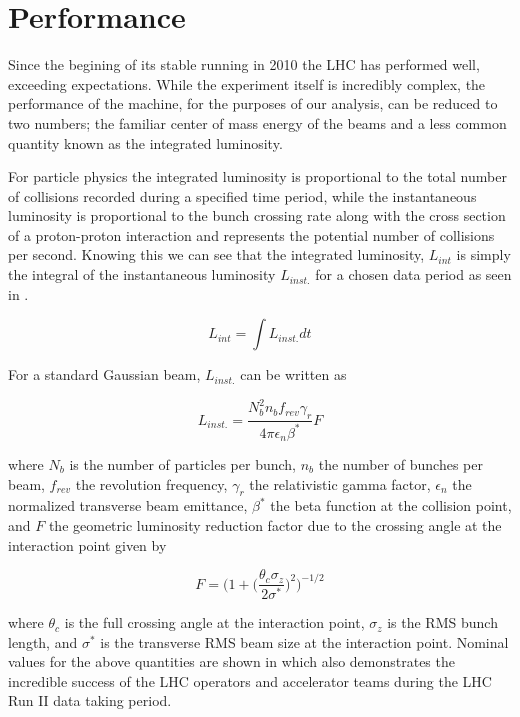 \section{Performance} \label{sec:lhc:performance}

Since the begining of its stable running in 2010 the LHC has performed well,
exceeding expectations.  While the experiment itself is incredibly complex, the
performance of the machine, for the purposes of our analysis, can be reduced to
two numbers; the familiar center of mass energy of the beams and a less common
quantity known as the integrated luminosity.  

For particle physics the integrated luminosity is proportional to the total
number of collisions recorded during a specified time period, while the
instantaneous luminosity is proportional to the bunch crossing rate along with
the cross section of a proton-proton interaction and represents the potential
number of collisions per second.  Knowing this we can see that the integrated
luminosity, $L_{int}$ is simply the integral of the instantaneous luminosity
$L_{inst.}$ for a chosen data period as seen in
.

\begin{equation} \label{eq:integrated_luminosity}
   L_{int} = \int L_{inst.}dt 
\end{equation}

For a standard Gaussian beam, $L_{inst.}$ can be written as

\begin{equation} \label{eq:inst_luminosity}
  L_{inst.} = \frac{N_{b}^{2}n_{b}f_{rev}\gamma_{r}}{4\pi\epsilon_{n}\beta^{*}}F
\end{equation}

where $N_{b}$ is the number of particles per bunch, $n_{b}$ the number of
bunches per beam, $f_{rev}$ the revolution frequency, $\gamma_{r}$ the
relativistic gamma factor, $\epsilon_{n}$ the normalized transverse beam
emittance, $\beta^{*}$ the beta function at the collision point, and $F$ the
geometric luminosity reduction factor due to the crossing angle at the
interaction point given by

\begin{equation}
  F = \bigg(1 + \Big( \frac{\theta_{c}\sigma_{z}}{2\sigma^{*}} \Big) ^{2}
\bigg)^{-1/2} 
\end{equation}

where $\theta_{c}$ is the full crossing angle at the interaction point,
$\sigma_{z}$ is the RMS bunch length, and $\sigma^{*}$ is the transverse RMS
beam size at the interaction point. Nominal values for the above quantities are
shown in  which also demonstrates the incredible
success of the LHC operators and accelerator teams during the LHC Run II data
taking period.


